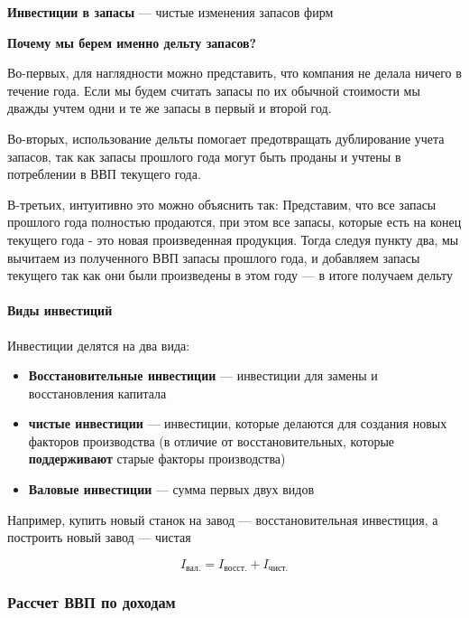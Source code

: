 \documentclass{article}
\begin{document}
    \quad

    \textbf{Инвестиции в запасы} --- чистые изменения запасов фирм

    \quad

    \textbf{Почему мы берем именно дельту запасов?}

    \quad

    Во-первых, для наглядности можно представить, что компания не делала
    ничего в течение года. Если мы будем считать запасы по их обычной стоимости мы дважды учтем одни и те же запасы в первый и второй год.

    Во-вторых, использование дельты помогает предотвращать дублирование учета запасов, так как запасы прошлого года могут быть проданы и учтены в потреблении
    в ВВП текущего года.

    В-третьих, интуитивно это можно объяснить так: Представим, что все запасы прошлого года полностью продаются, при этом все запасы, которые
    есть на конец текущего года - это новая произведенная продукция. Тогда следуя пункту два, мы вычитаем из полученного ВВП запасы прошлого года, и добавляем запасы текущего
    так как они были произведены в этом году --- в итоге получаем дельту
    
    \paragraph{Виды инвестиций}

    Инвестиции делятся на два вида:
    \begin{itemize}
        \item \textbf{Восстановительные инвестиции} --- инвестиции для замены и восстановления капитала
        \item \textbf{чистые инвестиции} --- инвестиции, которые делаются для создания новых факторов производства (в отличие от восстановительных, которые \textbf{поддерживают} старые факторы производства)
        \item \textbf{Валовые инвестиции} --- сумма первых двух видов
    \end{itemize}

    Например, купить новый станок на завод --- восстановительная инвестиция, а построить новый завод --- чистая

    \begin{equation}
        I_{\text{вал.}} = I_{\text{восст.}} + I_{\text{чист.}}
    \end{equation}
    
    \subsubsection{Рассчет ВВП по доходам}
    
\end{document}
